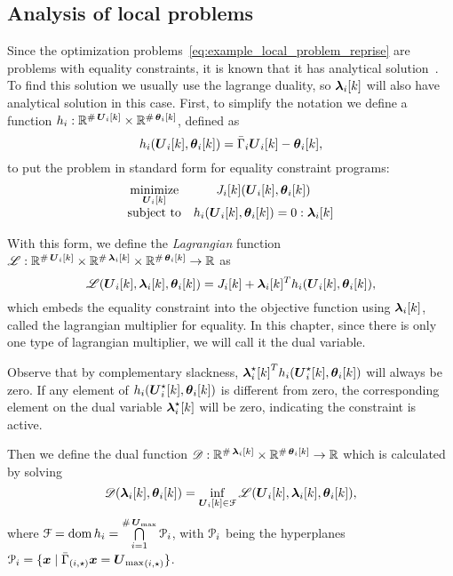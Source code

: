 \documentclass[../main.tex]{subfiles}
\begin{document}
\subsection{Analysis of local problems}\label{sec:analysis-local-problems}
Since the optimization problems~\eqref{eq:example_local_problem_reprise} are \qp{} problems with equality constraints, it is known that it has analytical solution~\cite{BoydVandenberghe2004}.
To find this solution we usually use the lagrange duality, so $\lambdaik$ will also have analytical solution in this case.
First, to simplify the notation we define a function $\equalityfunctionname:\R^{\card\vec{U}_{i}[k]}\times \R^{\card\thetaik}$, defined as
\begin{equation}
  \label{eq:lagrangian_equality}
  \equalityfunction=\bar{\Gamma}_{i}\vec{U}_i[k]-\thetaik,
\end{equation}
to put the problem in standard form for equality constraint \qp{} programs:
\begin{equation}
  \begin{matrix}
  \label{eq:local_problem_equality_standard_notation}
    \minimize\limits_{\vec{U}_{i}[k]}&\obji(\vec{U}_{i}[k],\thetaik)\\
    \mathrm{subject~ to} & \equalityfunction= 0:\lambdaik
  \end{matrix}
\end{equation}

With this form, we define the \emph{Lagrangian} function $\lagrangianname : \R^{\card\vec{U}_{i}[k]}\times \R^{\card\lambdaik} \times \R^{\card\thetaik} \to \R$ as
\begin{equation}
  \label{eq:lagrangian_equality}
  \lagrangian=\obji+\lambdaik^T\equalityfunction,
\end{equation}
which embeds the equality constraint into the objective function using $\lambdaik$, called the lagrangian multiplier for equality.
In this chapter, since there is only one type of lagrangian multiplier, we will call it the dual variable.
\begin{remark}
  Observe that by complementary slackness, ${\lambdaikstar}^T\equalityfunctionname(\vec{U}_{i}^{\star}[k],\thetaik)$ will always be zero.
 If any element of $\equalityfunctionname(\vec{U}_{i}^{\star}[k],\thetaik)$ is different from zero, the corresponding element on the dual variable $\lambdaikstar$ will be zero, indicating the constraint is active.
\end{remark}

Then we define the dual function $\dualfunctionname:\R^{\card\lambdaik} \times \R^{\card\thetaik} \to \R$ which is calculated by solving
\begin{equation}
  \label{eq:dual_function_equality}
  \dualfunction=\inf_{\vec{U}_{i}[k]\in\set{F}} \lagrangian,
\end{equation}
where $\set{F}=\dom \equalityfunctionname=\bigcap\limits_{i=1}^{\card\vec{U}_{\max}}\set{P}_{i}$, with $\set{P}_{i}$ being the hyperplanes
${\set{P}_i=\setbuild{\vec{x}}{\elem[i,\star]{{\bar{\Gamma}}}\vec{x}=\elem[i,\star]{\vec{U}_{\max}}}}$.
\end{document}
